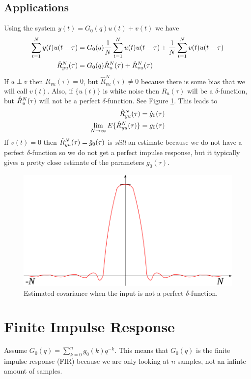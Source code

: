 \subsection{Applications}
Using the system $y(t) = G_0(q)u(t)+v(t)$ we have
\begin{align*}
\sum_{t=1}^Ny(t)u(t-\tau) &= G_0(q)\frac{1}{N}\sum_{t=1}^Nu(t)u(t-\tau) + \frac{1}{N}\sum_{t=1}^Nv(t)u(t-\tau) \\
\hat{R}_{yu}^N(\tau) &= G_0(q)\hat{R}_u^N(\tau) + \hat{R}_{vu}^N(\tau)
\end{align*}
If $u\perp v$ then $R_{vu}(\tau)=0$, but $\hat{R}_{vu}^N(\tau)\neq 0$ because there is some bias that we will call $v(t)$. Also, if $\{u(t)\}$ is white noise then $R_u(\tau)$ will be a $\delta$-function, but $\hat{R}_u^N(\tau)$ will not be a perfect $\delta$-function. See Figure \ref{fig:05xcov}. This leads to
\begin{align*}
\hat{R}_{yu}^N(\tau) &= \hat{g}_0(\tau) \\
\lim_{N\to\infty}E\{\hat{R}_{yu}^N(\tau)\} &= g_0(\tau)
\end{align*}
If $v(t)=0$ then $\hat{R}_{yu}^N(\tau)=\hat{g}_0(\tau)$ is \textit{still} an estimate because we do not have a perfect $\delta$-function so we do not get a perfect impulse response, but it typically gives a pretty close estimate of the parameters $g_0(\tau)$.
\begin{figure}[ht!]
	\centering
	\includegraphics[width=.5\textwidth]{images/05xcov}
	\caption{Estimated covariance when the input is not a perfect $\delta$-function.}
	\label{fig:05xcov}
\end{figure}

\section{Finite Impulse Response}
Assume $G_0(q) = \sum_{k=0}^ng_0(k)q^{-k}$. This means that $G_0(q)$ is the finite impulse response (FIR) because we are only looking at $n$ samples, not an infinte amount of samples.

